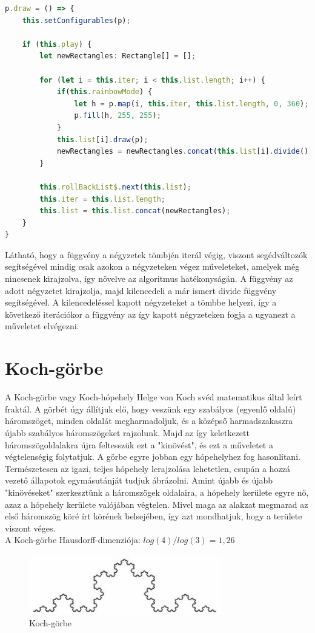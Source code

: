 \begin{lstlisting}[language=typescript]
p.draw = () => {
	this.setConfigurables(p);

	if (this.play) {
		let newRectangles: Rectangle[] = [];
		
		for (let i = this.iter; i < this.list.length; i++) {
			if(this.rainbowMode) {
				let h = p.map(i, this.iter, this.list.length, 0, 360);
				p.fill(h, 255, 255);
			}
			this.list[i].draw(p);
			newRectangles = newRectangles.concat(this.list[i].divide());
		}
		
		this.rollBackList$.next(this.list);
		this.iter = this.list.length;
		this.list = this.list.concat(newRectangles);
	}
}
\end{lstlisting}
Látható, hogy a függvény a négyzetek tömbjén iterál végig, viszont segédváltozók segítségével mindig csak azokon a négyzeteken végez műveleteket, amelyek még nincsenek kirajzolva, így növelve az algoritmus hatékonyságán. A függvény az adott négyzetet kirajzolja, majd kilencedeli a már ismert divide függvény segítségével. A kilencedeléssel kapott négyzeteket a tömbbe helyezi, így a következő iterációkor a függvény az így kapott négyzeteken fogja a ugyanezt a műveletet elvégezni.

	
\section*{Koch-görbe}
A Koch-görbe vagy Koch-hópehely Helge von Koch svéd matematikus által leírt fraktál. A görbét úgy állítjuk elő, hogy veszünk egy szabályos (egyenlő oldalú) háromszöget, minden oldalát megharmadoljuk, és a középső harmadszakaszra újabb szabályos háromszögeket rajzolunk. Majd az így keletkezett háromszögoldalakra újra feltesszük ezt a "kinövést", és ezt a műveletet a végtelenségig folytatjuk. A görbe egyre jobban egy hópehelyhez fog hasonlítani. Természetesen az igazi, teljes hópehely lerajzolása lehetetlen, csupán a hozzá vezető állapotok egymásutánját tudjuk ábrázolni. Amint újabb és újabb "kinövéseket" szerkesztünk a háromszögek oldalaira, a hópehely kerülete egyre nő, azaz a hópehely kerülete valójában végtelen. Mivel maga az alakzat megmarad az első háromszög köré írt körének belsejében, így azt mondhatjuk, hogy a területe viszont véges.\\
A Koch-görbe Hausdorff-dimenziója: $log(4)/log(3) = 1,26$ \cite{koch-gorbe-wiki}
\begin{figure}[!ht]
	\begin{center}
		\includegraphics[width=0.75\textwidth]{img/KochCurve}
		\caption[labelInTOC]{Koch-görbe}
	\end{center}
\end{figure}
